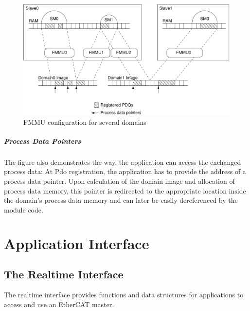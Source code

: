 \documentclass[a4paper,12pt,BCOR6mm,bibtotoc,idxtotoc]{scrbook}
\begin{document}
\begin{figure}[htbp]
  \centering
  \includegraphics[width=\textwidth]{images/fmmus}
  \caption{FMMU configuration for several domains}
  \label{fig:fmmus}
\end{figure}

\paragraph{Process Data Pointers} %

The figure also demonstrates the way, the application can access the exchanged
process data: At Pdo registration, the application has to provide the address
of a process data pointer. Upon calculation of the domain image and allocation
of process data memory, this pointer is redirected to the appropriate location
inside the domain's process data memory and can later be easily dereferenced by
the module code.


\chapter{Application Interface}
\label{sec:ecrt}


\section{The Realtime Interface} %
\label{sec:ecrt}

The realtime interface provides functions and data structures for applications
to access and use an EtherCAT master.
\end{document}

